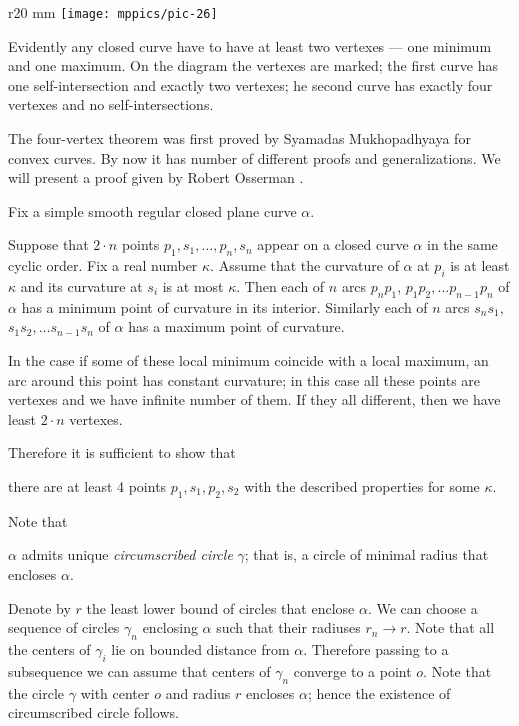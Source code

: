 \begin{wrapfigure}[8]{r}{20 mm}
\vskip-4mm
\centering
\texttt{[image: mppics/pic-26]}
\vskip0mm
\end{wrapfigure}

Evidently any closed curve have to have at least two vertexes --- one minimum and one maximum.
On the diagram the vertexes are marked;
the first curve has one self-intersection and exactly two vertexes;
he second curve has exactly four vertexes and no self-intersections.

The four-vertex theorem was first proved by Syamadas Mukhopadhyaya \cite{mukhopadhyaya} for convex curves.
By now it has number of different proofs and generalizations.
We will present a proof given by Robert Osserman \cite{osserman}.

Fix a simple smooth regular closed plane curve $\alpha$.

Suppose that $2\cdot n$ points $p_1,s_1,\dots,p_n,s_n$ appear on a closed curve $\alpha$ in the same cyclic order.
Fix a real number $\kappa$.
Assume that the curvature of $\alpha$ at $p_i$ is at least $\kappa$ and its curvature at $s_i$ is at most $\kappa$.
Then each of $n$ arcs $p_{n}p_1$, $p_{1}p_2, \dots p_{n-1}p_n$ of
$\alpha$ has a minimum point of curvature in its interior.
Similarly each of $n$ arcs $s_{n}s_1$, $s_{1}s_2, \dots s_{n-1}s_n$ of
$\alpha$ has a maximum point of curvature.

In the case if some of these local minimum coincide with a local maximum,
an arc around this point has constant curvature;
in this case all these points are vertexes and we have infinite number of them.
If they all different, then we have least $2\cdot n$ vertexes.

Therefore it is sufficient to show that

\begin{clm}{}\label{clm-key}
there are at least 4 points $p_1,s_1,p_2,s_2$ with the described properties for some $\kappa$.
\end{clm}


Note that
\begin{clm}{}\label{clm:circumscribed circle}
$\alpha$
admits unique \emph{circumscribed circle} $\gamma$; that is, a circle of minimal radius that encloses $\alpha$.
\end{clm}

Denote by $r$ the least lower bound of circles that enclose $\alpha$.
We can choose a sequence of circles $\gamma_n$ enclosing $\alpha$ such that their radiuses $r_n\to r$.
Note that all the centers of $\gamma_i$ lie on bounded distance from $\alpha$.
Therefore passing to a subsequence we can assume that centers of $\gamma_n$ converge to a point $o$.
Note that the circle $\gamma$ with center $o$ and radius $r$ encloses $\alpha$;
hence the existence of circumscribed circle follows.

